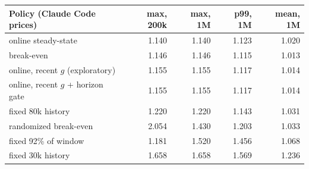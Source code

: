 \begin{tabular}{lrrrr}
\toprule
Policy (Claude Code prices) & max, 200k & max, 1M & p99, 1M & mean, 1M\\
\midrule
online steady-state & 1.140 & 1.140 & 1.123 & 1.020\\
break-even & 1.146 & 1.146 & 1.115 & 1.013\\
online, recent $g$ (exploratory) & 1.155 & 1.155 & 1.117 & 1.014\\
online, recent $g$ + horizon gate & 1.155 & 1.155 & 1.117 & 1.014\\
fixed 80k history & 1.220 & 1.220 & 1.143 & 1.031\\
randomized break-even & 2.054 & 1.430 & 1.203 & 1.033\\
fixed 92\% of window & 1.181 & 1.520 & 1.456 & 1.068\\
fixed 30k history & 1.658 & 1.658 & 1.569 & 1.236\\
\bottomrule
\end{tabular}
